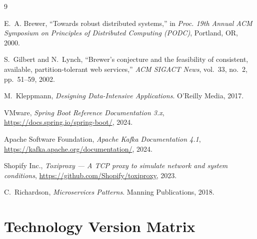 \documentclass[12pt,a4paper,twoside]{article}
\begin{document}
\newpage
\begin{thebibliography}{9}

E.~A. Brewer,
\newblock ``Towards robust distributed systems,''
\newblock in \emph{Proc. 19th Annual ACM Symposium on Principles of Distributed
  Computing (PODC)}, Portland, OR, 2000.

S.~Gilbert and N.~Lynch,
\newblock ``Brewer's conjecture and the feasibility of consistent, available,
  partition-tolerant web services,''
\newblock \emph{ACM SIGACT News}, vol.~33, no.~2, pp.~51--59, 2002.

M.~Kleppmann,
\newblock \emph{Designing Data-Intensive Applications}.
\newblock O'Reilly Media, 2017.

VMware,
\newblock \emph{Spring Boot Reference Documentation 3.x},
\newblock \url{https://docs.spring.io/spring-boot/}, 2024.

Apache Software Foundation,
\newblock \emph{Apache Kafka Documentation 4.1},
\newblock \url{https://kafka.apache.org/documentation/}, 2024.

Shopify Inc.,
\newblock \emph{Toxiproxy — A TCP proxy to simulate network and system
  conditions},
\newblock \url{https://github.com/Shopify/toxiproxy}, 2023.

C.~Richardson,
\newblock \emph{Microservices Patterns}.
\newblock Manning Publications, 2018.

\end{thebibliography}

\appendix
\section{Technology Version Matrix}
\label{app:versions}
\end{document}
